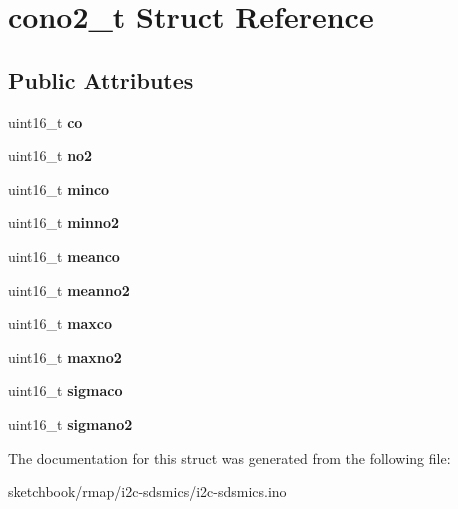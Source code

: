 \hypertarget{structcono2__t}{}\section{cono2\+\_\+t Struct Reference}
\label{structcono2__t}
\subsection*{Public Attributes}
\begin{DoxyCompactItemize}
\item 
\mbox{\label{structcono2__t_acd59efef032125e71feb7fd313be5c6d}} 
uint16\+\_\+t {\bfseries co}
\item 
\mbox{\label{structcono2__t_a45687ef9dff9663cbbc25f18a2ad5f15}} 
uint16\+\_\+t {\bfseries no2}
\item 
\mbox{\label{structcono2__t_a4157fb1993673bbb2cf8a9a177b341c8}} 
uint16\+\_\+t {\bfseries minco}
\item 
\mbox{\label{structcono2__t_a886561064a2b4d294b7caa2a0c5c5ae6}} 
uint16\+\_\+t {\bfseries minno2}
\item 
\mbox{\label{structcono2__t_a236c49949c88c92af5053a50acbaff33}} 
uint16\+\_\+t {\bfseries meanco}
\item 
\mbox{\label{structcono2__t_a24333bb6770e4d72338806a2bf3b7bc3}} 
uint16\+\_\+t {\bfseries meanno2}
\item 
\mbox{\label{structcono2__t_ae5e6deeae7a98ea01d937381c1cb77c5}} 
uint16\+\_\+t {\bfseries maxco}
\item 
\mbox{\label{structcono2__t_a8a83c9c62d88f60b54128747d4ff15f4}} 
uint16\+\_\+t {\bfseries maxno2}
\item 
\mbox{\label{structcono2__t_a736889e9b172d4adbf628c79bfff455f}} 
uint16\+\_\+t {\bfseries sigmaco}
\item 
\mbox{\label{structcono2__t_a429c7d85b70e2d1d0dbae8a79c97982b}} 
uint16\+\_\+t {\bfseries sigmano2}
\end{DoxyCompactItemize}


The documentation for this struct was generated from the following file\+:\begin{DoxyCompactItemize}
\item 
sketchbook/rmap/i2c-\/sdsmics/i2c-\/sdsmics.\+ino\end{DoxyCompactItemize}

